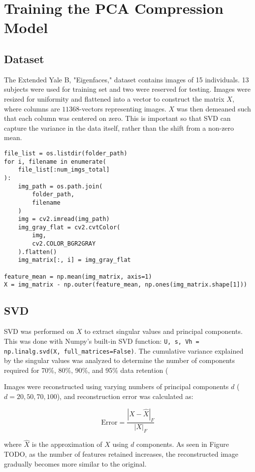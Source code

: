 \documentclass[conference]{IEEEtran}
\begin{document}
\section{Training the PCA Compression Model}
\subsection{Dataset}
The Extended Yale B, "Eigenfaces," dataset contains images of 15 individuals. 13 subjects were used for training set and two were reserved for testing. Images were resized for uniformity and flattened into a vector to construct the matrix $X$, where columns are $11368$-vectors representing images. $X$ was then demeaned such that each column was centered on zero. This is important so that SVD can capture the variance in the data itself, rather than the shift from a non-zero mean.

\begin{verbatim}
file_list = os.listdir(folder_path)
for i, filename in enumerate(
    file_list[:num_imgs_total]
):
    img_path = os.path.join(
        folder_path,
        filename
    )
    img = cv2.imread(img_path)
    img_gray_flat = cv2.cvtColor(
        img,
        cv2.COLOR_BGR2GRAY
    ).flatten()
    img_matrix[:, i] = img_gray_flat

feature_mean = np.mean(img_matrix, axis=1)
X = img_matrix - np.outer(feature_mean, np.ones(img_matrix.shape[1]))
\end{verbatim}


\subsection{SVD}
SVD was performed on $X$ to extract singular values and principal components. This was done with Numpy's built-in SVD function: \texttt{U, s, Vh = np.linalg.svd(X, full\_matrices=False)}. The cumulative variance explained by the singular values was analyzed to determine the number of components required for 70\%, 80\%, 90\%, and 95\% data retention (%

Images were reconstructed using varying numbers of principal components $d$ ($d=20,50,70,100$), and reconstruction error was calculated as: 

\[\text{Error} = \frac{|X - \hat{X}|_F}{|X|_F}\]

where $\hat{X}$ is the approximation of $X$ using $d$ components. As seen in Figure TODO, as the number of features retained increases, the reconstructed image gradually becomes more similar to the original.
\end{document}
